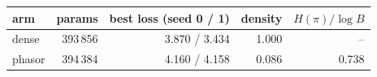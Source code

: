 \begin{tabular}{lrrrr}
\toprule
arm & params & best loss (seed 0 / 1) & density & $H(\pi)/\log B$ \\
\midrule
dense & 393\,856 & 3.870 / 3.434 & 1.000 & -- \\
phasor & 394\,384 & 4.160 / 4.158 & 0.086 & 0.738 \\
\bottomrule
\end{tabular}